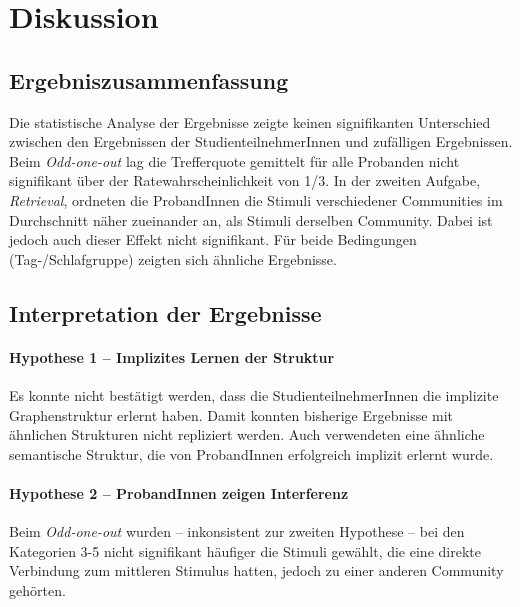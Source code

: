 \section{Diskussion}
\label{S:4}
\subsection{Ergebniszusammenfassung}
Die statistische Analyse der Ergebnisse zeigte keinen signifikanten Unterschied zwischen den Ergebnissen der StudienteilnehmerInnen und zufälligen Ergebnissen. Beim \textit{Odd-one-out} lag die Trefferquote gemittelt für alle Probanden nicht signifikant über der Ratewahrscheinlichkeit von 1/3. In der zweiten Aufgabe, \textit{Retrieval}, ordneten die ProbandInnen die Stimuli verschiedener Communities im Durchschnitt näher zueinander an, als Stimuli derselben Community. Dabei ist jedoch auch dieser Effekt nicht signifikant. Für beide Bedingungen (Tag-/Schlafgruppe) zeigten sich ähnliche Ergebnisse.

\subsection{Interpretation der Ergebnisse}
\paragraph{Hypothese 1 – Implizites Lernen der Struktur}
Es konnte nicht bestätigt werden, dass die StudienteilnehmerInnen die implizite Graphenstruktur erlernt haben. Damit konnten bisherige Ergebnisse mit ähnlichen Strukturen \citep[see][]{Schapiro2013} nicht repliziert werden. Auch \citet{Garvert2017} verwendeten eine ähnliche semantische Struktur, die von ProbandInnen erfolgreich implizit erlernt wurde.

\paragraph{Hypothese 2 – ProbandInnen zeigen Interferenz}
Beim \textit{Odd-one-out} wurden – inkonsistent zur zweiten Hypothese – bei den Kategorien 3-5 nicht signifikant häufiger die Stimuli gewählt, die eine direkte Verbindung zum mittleren Stimulus hatten, jedoch zu einer anderen Community gehörten.

